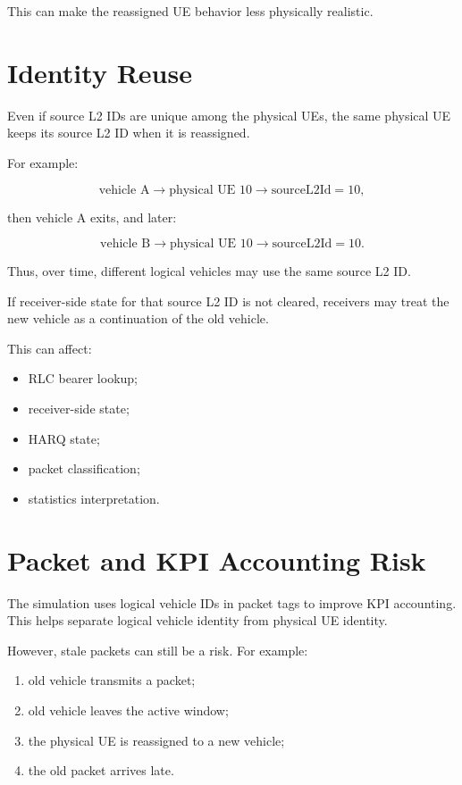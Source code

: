 \documentclass[11pt]{article}
\begin{document}
This can make the reassigned UE behavior less physically realistic.

\section{Identity Reuse}

Even if source L2 IDs are unique among the physical UEs, the same physical UE keeps its source L2 ID when it is reassigned.

For example:

\[
\text{vehicle A} \rightarrow \text{physical UE 10} \rightarrow \text{sourceL2Id}=10,
\]

then vehicle A exits, and later:

\[
\text{vehicle B} \rightarrow \text{physical UE 10} \rightarrow \text{sourceL2Id}=10.
\]

Thus, over time, different logical vehicles may use the same source L2 ID.

If receiver-side state for that source L2 ID is not cleared, receivers may treat the new vehicle as a continuation of the old vehicle.

This can affect:

\begin{itemize}
    \item RLC bearer lookup;
    \item receiver-side state;
    \item HARQ state;
    \item packet classification;
    \item statistics interpretation.
\end{itemize}

\section{Packet and KPI Accounting Risk}

The simulation uses logical vehicle IDs in packet tags to improve KPI accounting. This helps separate logical vehicle identity from physical UE identity.

However, stale packets can still be a risk. For example:

\begin{enumerate}
    \item old vehicle transmits a packet;
    \item old vehicle leaves the active window;
    \item the physical UE is reassigned to a new vehicle;
    \item the old packet arrives late.
\end{enumerate}
\end{document}
